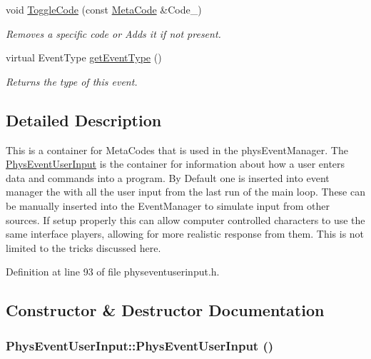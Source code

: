 \begin{DoxyCompactItemize}
void \hyperlink{classPhysEventUserInput_a8325bb0172db6ea02fd06f4a5d1a7378}{ToggleCode} (const \hyperlink{classMetaCode}{MetaCode} \&Code\_\-)
\begin{DoxyCompactList}\small\item\em Removes a specific code or Adds it if not present. \item\end{DoxyCompactList}\item 
virtual EventType \hyperlink{classPhysEventUserInput_a7adabb15e8012a86c9da1910033eea4b}{getEventType} ()
\begin{DoxyCompactList}\small\item\em Returns the type of this event. \item\end{DoxyCompactList}\end{DoxyCompactItemize}


\subsection{Detailed Description}
This is a container for MetaCodes that is used in the physEventManager. The \hyperlink{classPhysEventUserInput}{PhysEventUserInput} is the container for information about how a user enters data and commands into a program. By Default one is inserted into event manager the with all the user input from the last run of the main loop. These can be manually inserted into the EventManager to simulate input from other sources. If setup properly this can allow computer controlled characters to use the same interface players, allowing for more realistic response from them. This is not limited to the tricks discussed here. 

Definition at line 93 of file physeventuserinput.h.

\subsection{Constructor \& Destructor Documentation}
\hypertarget{classPhysEventUserInput_a6f8eaf698e8109d5cb30f2f17044f1ba}{
\subsubsection[{PhysEventUserInput}]{\setlength{\rightskip}{0pt plus 5cm}PhysEventUserInput::PhysEventUserInput ()}}
\label{dc/d0e/classPhysEventUserInput_a6f8eaf698e8109d5cb30f2f17044f1ba}


